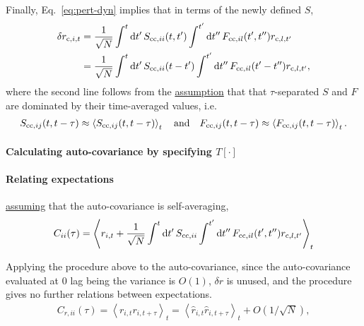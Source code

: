 \documentclass[11pt,openany,oneside]{article} %
\renewcommand{\d}{\mathrm{d}}
\newcommand{\ept}[1]{\left\langle #1\right\rangle}%
\newcommand{\tand}{\quad\text{and}\quad}
\begin{document}
Finally, Eq.~\ref{eq:pert-dyn} implies that in terms of the newly defined $S$,
\begin{equation}
  \label{eq:pert-sol}
  \begin{aligned}
    \delta r_{\cct,i,t} &= \frac{1}{\sqrt{N}}\int^t\d t'\,S_{\cct\cct,ii}(t,t') \int^{t'}\d t''\,F_{\cct\cct,il}(t',t'') r_{\cct,l,t'}\\
  &= \frac{1}{\sqrt{N}}\int^t\d t'\,S_{\cct\cct,ii}(t-t') \int^{t'}\d t''\,F_{\cct\cct,il}(t'-t'') r_{\cct,l,t'},
  \end{aligned}
\end{equation}
where the second line follows from the \uline{assumption} that that $\tau$-separated $S$ and $F$ are
dominated by their time-averaged values, i.e.
\begin{align*}
  S_{\cct\cct,ij}(t,t-\tau) \approx \ept{S_{\cct\cct,ij}(t,t-\tau)}_t\tand F_{\cct\cct,ij}(t,t-\tau) \approx \ept{F_{\cct\cct,ij}(t,t-\tau)}_t.
\end{align*}

\paragraph{Calculating auto-covariance by specifying $T[\cdot]$}


\paragraph{Relating expectations}



\uline{assuming} that the auto-covariance is self-averaging,
\begin{equation}
  \label{eq:auto-cov}
  C_{ii}(\tau) = \ept{r_{i,t}+\frac{1}{\sqrt{N}}\int^t\d t'\,S_{\cct\cct,ii} \int^{t'}\d t''\,F_{\cct\cct,il}(t',t'') r_{\cct,l,t'}}_t
\end{equation}


Applying the procedure above to the auto-covariance, since the auto-covariance evaluated at $0$ lag
being the variance is $O(1)$, $\delta r$ is unused, and the procedure gives no further relations
between expectations.
\begin{align*}
  C_{r,ii}(\tau) = \ept{r_{i,t}r_{i,t+\tau}}_t = \ept{\hat{r}_{i,t}\hat{r}_{i,t+\tau}}_t + O(1/\sqrt{N}),
\end{align*}
\end{document}
